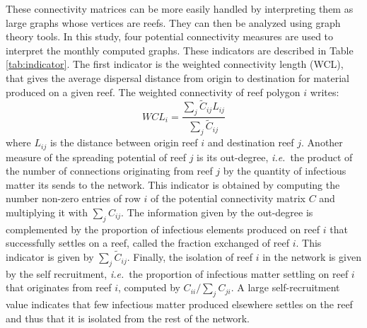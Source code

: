 \documentclass[utf8]{frontiersSCNS}
\newcommand{\ie}{{\it i.e.}\ }
\begin{document}
These connectivity matrices can be more easily handled by interpreting them as large graphs whose vertices are reefs. They can then be analyzed using graph theory tools. In this study, four potential connectivity measures are used to interpret the monthly computed graphs. These indicators are described in Table \ref{tab:indicator}. The first indicator is the weighted connectivity length (WCL), that gives the average dispersal distance from origin to destination for material produced on a given reef. The weighted connectivity of reef polygon $i$ writes:
\begin{equation}
    WCL_i = \dfrac{\sum_j \tilde{C}_{ij} L_{ij}}{\sum_j \tilde{C}_{ij}}
\end{equation}
where $L_{ij}$ is the distance between origin reef $i$ and destination reef $j$. Another measure of the spreading potential of reef $j$ is its out-degree, \ie the product of the number of connections originating from reef $j$ by the quantity of infectious matter its sends to the network. This indicator is obtained by computing the number non-zero entries of row $i$ of the potential connectivity matrix $C$ and multiplying it with $\sum_j C_{ij}$. The information given by the out-degree is complemented by the proportion of infectious elements produced on reef $i$ that successfully settles on a reef, called the fraction exchanged of reef $i$. This indicator is given by $\sum_{j} \tilde{C}_{ij}$. Finally, the isolation of reef $i$ in the network is given by the self recruitment, \ie the proportion of infectious matter settling on reef $i$ that originates from reef $i$, computed by $C_{ii}/\sum_jC_{ji}$. A large self-recruitment value indicates that few infectious matter produced elsewhere settles on the reef and thus that it is isolated from the rest of the network. 
\end{document}
